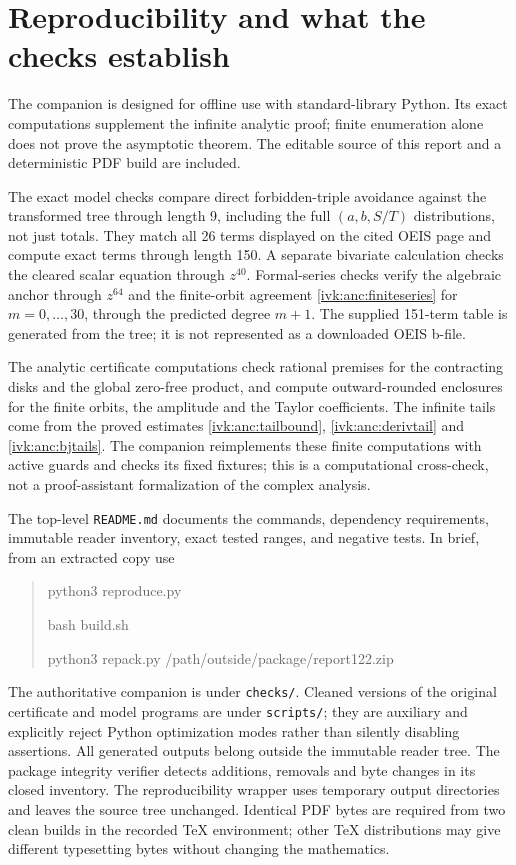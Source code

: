 \documentclass[11pt,letterpaper]{article}
\theoremstyle{remark}\newtheorem{remark}[theorem]{Remark}
\begin{document}
\section{Reproducibility and what the checks establish}\label{ivk:anc:sec:reproduce}
The companion is designed for offline use with standard-library
Python. Its exact computations supplement the infinite analytic
proof; finite enumeration alone does not prove the asymptotic
theorem. The editable source of this report and a deterministic
PDF build are included.

The exact model checks compare direct forbidden-triple avoidance
against the transformed tree through length 9, including the full
$(a,b,S/T)$ distributions, not just totals. They match all 26
terms displayed on the cited OEIS page and compute exact terms
through length 150. A separate bivariate calculation checks the
cleared scalar equation through $z^{40}$. Formal-series checks
verify the algebraic anchor through $z^{64}$ and the finite-orbit
agreement \eqref{ivk:anc:finiteseries} for $m=0,\ldots,30$, through the
predicted degree $m+1$. The supplied 151-term table is generated
from the tree; it is not represented as a downloaded OEIS b-file.

The analytic certificate computations check rational premises
for the contracting disks and the global zero-free product, and
compute outward-rounded enclosures for the finite orbits, the
amplitude and the Taylor coefficients. The infinite tails come
from the proved estimates \eqref{ivk:anc:tailbound}, \eqref{ivk:anc:derivtail}
and \eqref{ivk:anc:bjtails}. The companion reimplements these finite
computations with active guards and checks its fixed fixtures;
this is a computational cross-check, not a proof-assistant
formalization of the complex analysis.

The top-level \texttt{README.md} documents the commands, dependency
requirements, immutable reader inventory, exact tested ranges,
and negative tests. In brief, from an extracted copy use
\begin{quote}\ttfamily
 python3 reproduce.py\par
 bash build.sh\par
 python3 repack.py /path/outside/package/report122.zip
\end{quote}
The authoritative companion is under \texttt{checks/}. Cleaned
versions of the original certificate and model programs are under
\texttt{scripts/}; they are auxiliary and explicitly reject Python
optimization modes rather than silently disabling assertions.
All generated outputs belong outside the immutable reader tree.
The package integrity verifier detects additions, removals and
byte changes in its closed inventory. The reproducibility wrapper
uses temporary output directories and leaves the source tree
unchanged. Identical PDF bytes are required from two clean builds
in the recorded TeX environment; other TeX distributions may give
different typesetting bytes without changing the mathematics.
\end{document}
